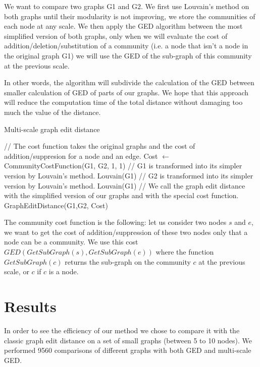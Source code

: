 \documentclass[UTF8, twoside]{EPURapport}
\begin{document}
	\hspace{4ex}We want to compare two graphs G1 and G2. We first use Louvain's method on both graphs until their modularity is not improving, we store the communities of each node at any scale. We then apply the GED algorithm between the most simplified version of both graphs, only when we will evaluate the cost of addition/deletion/substitution of a community (i.e. a node that isn't a node in the original graph G1) we will use the GED of the sub-graph of this community at the previous scale.
	
	In other words, the algorithm will subdivide the calculation of the GED between smaller calculation of GED of parts of our graphs. We hope that this approach will reduce the computation time of the total distance without damaging too much the value of the distance. 
\\

\begin{algorithm}
	\caption{Multi-scale graph edit distance}
	\begin{algorithmic}[1]
		\State // The cost function takes the original graphs and the cost of addition/suppresion for a node and an edge.
		\State Cost $\gets$ CommunityCostFunction(G1, G2, 1, 1)
		\State // G1 is transformed into its simpler version by Louvain's method.
		\State Louvain(G1)
		\State // G2 is transformed into its simpler version by Louvain's method.
		\State Louvain(G1)
		\State // We call the graph edit distance with the simplified version of our graphs and with the special cost function.
		\State \Return GraphEditDistance(G1,G2, Cost)
	\end{algorithmic}
\end{algorithm}

	The community cost function is the following: let us consider two nodes $s$ and $e$, we want to get the cost of addition/suppression of these two nodes only that a node can be a community. We use this cost $GED(GetSubGraph(s),GetSubGraph(e))$ where the function $GetSubGraph(c)$ returns the sub-graph on the community $c$ at the previous scale, or $c$ if $c$ is a node.
	
\chapter{Results}

	\hspace{4ex}In order to see the efficiency of our method we chose to compare it with the classic graph edit distance on a set of small graphs (between 5 to 10 nodes). We performed 9560 comparisons of different graphs with both GED and multi-scale GED.
	
\end{document}
